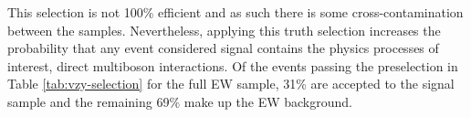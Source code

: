 This selection is not 100\% efficient and as such there is some
cross-contamination between the samples. Nevertheless, applying this truth
selection increases the probability that any event considered signal contains
the physics processes of interest, direct multiboson interactions.  Of the
events passing the preselection in Table \ref{tab:vzy-selection} for the full
\ac{EW} \Zyjj sample, 31\% are accepted to the \VZy signal sample and the
remaining 69\% make up the \ac{EW} background.
